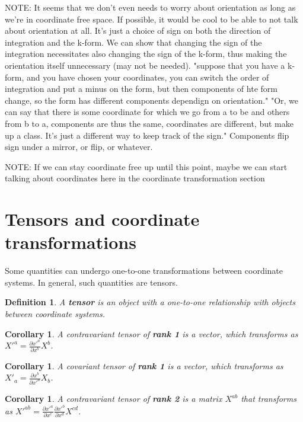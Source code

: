 \documentclass{book}
\newtheorem{defn}[equation]{Definition}
\newtheorem{coro}[equation]{Corollary}
\begin{document}
NOTE: It seems that we don't even needs to worry about orientation as long as we're in coordinate free space. If possible, it would be cool to be able to not talk about orientation at all. It's just a choice of sign on both the direction of integration and the k-form. We can show that changing the sign of the integration necessitates also changing the sign of the k-form, thus making the orientation itself unnecessary (may not be needed). "suppose that you have a k-form, and you have chosen your coordinates, you can switch the order of integration and put a minus on the form, but then components of hte form change, so the form has different components dependign on orientation." "Or, we can say that there is some coordinate for which we go from a to be and others from b to a, components are thus the same, coordinates are different, but make up a class. It's just a different way to keep track of the sign." Components flip sign under a mirror, or flip, or whatever. 

NOTE: If we can stay coordinate free up until this point, maybe we can start talking about coordinates here in the coordinate transformation section
\section{Tensors and coordinate transformations}
Some quantities can undergo one-to-one transformations between coordinate systems. In general, such quantities are tensors. 


\begin{defn}
	A \textbf{tensor} is an object with a one-to-one relationship with objects between coordinate systems. 
\end{defn}

\begin{coro}
	A contravariant tensor of \textbf{rank 1} is a vector, which transforms as  $X'^a = \frac{\partial x'^a}{\partial x^b} X^b$.  
\end{coro}

\begin{coro}
	A covariant tensor of \textbf{rank 1} is a vector, which transforms as $X'_a = \frac{\partial x^b}{\partial x'^a} X_b$. 
\end{coro}

\begin{coro}
	A contravariant tensor of \textbf{rank 2} is a matrix $X^{ab}$ that transforms as $X'^{ab} = \frac{\partial x'^a}{\partial x^c} \frac{\partial x'^b}{\partial x^d} X^{cd}$. 
\end{coro}
\end{document}
